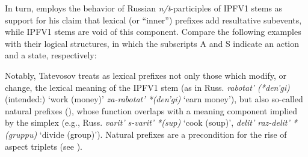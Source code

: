 \documentclass[output=paper]{langscibook}
\begin{document}
In turn, \citet[288--292]{Tatevosov2015Akcional} employs the behavior of Russian \textit{n/t}-par\-ti\-ci\-ples of IPFV1 stems as support for his claim that lexical (or ``inner'') prefixes add resultative subevents, while IPFV1 stems are void of this component. Compare the following examples with their logical structures, in which the subscripts A and S indicate an action and a state, respectively:

\ea\label{wiem:ex:vanja}
\label{wiem:ex:vanja-a}

\label{wiem:ex:vanja-b}
\z
\z

\noindent Notably, Tatevosov treats as lexical prefixes not only those which modify, or change, the lexical meaning of the IPFV1 stem (as in Russ. \textit{rabotat’ (*den’gi)} (intended:) ‘work (money)’ {\rightarrow} \textit{za-rabotat’ *(den’gi)} ‘earn money’), but also so-called natural prefixes (\citealt{Janda2007Aspectual}), whose function overlaps with a meaning component implied by the simplex (e.g., Russ. \textit{varit’ {\rightarrow} s-varit’ *(sup)} ‘cook (soup)’, \textit{delit’ {\rightarrow} raz-delit’ *(gruppu)} ‘divide (group)’). Natural prefixes are a precondition for the rise of aspect triplets (see ).
\end{document}
